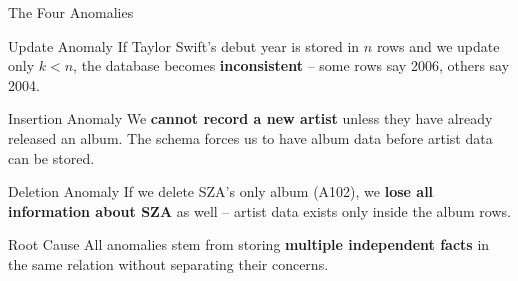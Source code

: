 \begin{frame}{The Four Anomalies}
  \begin{block}{Update Anomaly}
    If Taylor Swift's debut year is stored in $n$ rows and we update only $k < n$,
    the database becomes \textbf{inconsistent} -- some rows say 2006, others say 2004.
  \end{block}

  \begin{block}{Insertion Anomaly}
    We \textbf{cannot record a new artist} unless they have already released an album.
    The schema forces us to have album data before artist data can be stored.
  \end{block}

  \begin{block}{Deletion Anomaly}
    If we delete SZA's only album (A102), we \textbf{lose all information about SZA}
    as well -- artist data exists only inside the album rows.
  \end{block}

  \begin{alertblock}{Root Cause}
    All anomalies stem from storing \textbf{multiple independent facts} in the same
    relation without separating their concerns.
  \end{alertblock}
\end{frame}

